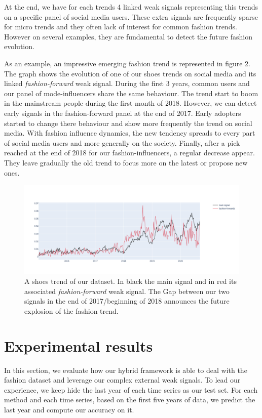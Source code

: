 \documentclass[letterpaper]{article} %
\begin{document}
At the end, we have for each trends 4 linked weak signals representing this trends on a specific panel of social media users. These extra signals are frequently sparse for micro trends and they often lack of interest for common fashion trends. However on several examples, they are fundamental to detect the future fashion evolution. 

As an example, an impressive emerging fashion trend is represented in figure 2. The graph shows the evolution of one of our shoes trends on social media and its linked \textit{fashion-forward} weak signal. During the first 3 years, common users and our panel of mode-influencers share the same behaviour. The trend start to boom in the mainstream people during the first month of 2018. However, we can detect early signals in the fashion-forward panel at the end of 2017. Early adopters started to change there behaviour and show more frequently the trend on social media. With fashion influence dynamics, the new tendency spreads to every part of social media users and more generally on the society. Finally, after a pick reached at the end of 2018 for our fashion-influencers, a regular decrease appear. They leave gradually the old trend to focus more on the latest or propose new ones. 

\begin{figure}
  \centering
    \includegraphics[width=1.\linewidth]{figure/good_example.png}
  \caption{A shoes trend of our dataset. In black the main signal and in red its associated \textit{fashion-forward} weak signal. The Gap between our two signals in the end of 2017/beginning of 2018 announces the future explosion of the fashion trend.}
\end{figure}



\section{Experimental results}
\label{sec:exp}
In this section, we evaluate how our hybrid framework is able to deal with the fashion dataset and leverage our complex external weak signals. To lead our experience, we keep hide the last year of each time series as our test set. For each method and each time series, based on the first five years of data, we predict the last year and compute our accuracy on it.
\end{document}
